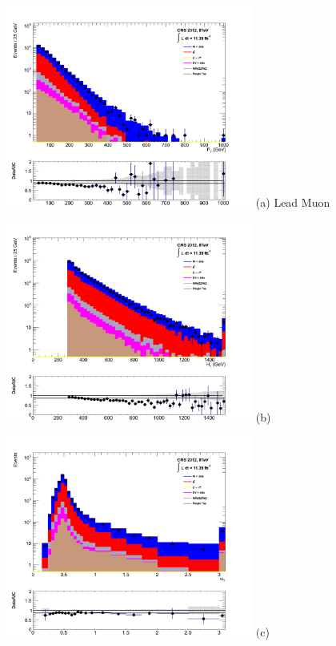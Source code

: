 \begin{itemize}
\begin{figure}[ht]
\centering
\begin{minipage}{.48\textwidth}
\centering
\includegraphics[width = 3.2in]{plots/muon_leadmu_datamc.pdf}
(a) Lead Muon \pt
\end{minipage}
\begin{minipage}{.48\textwidth}
\centering
\includegraphics[width = 3.2in]{plots/muon_ht_datamc.pdf}
(b) \theht
\end{minipage}
\begin{minipage}{.48\textwidth}
\centering
\includegraphics[width = 3.2in]{plots/muon_alphat_datamc.pdf}
$\text{(c}$) \alphat
\end{minipage}

\end{figure}
\end{itemize}
